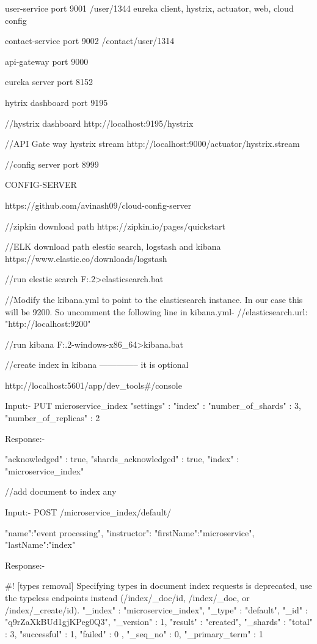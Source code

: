 user-service
			port 9001
			/user/1344
 eureka client, hystrix, actuator, web, cloud config
			
 contact-service
            port 9002
			/contact/user/1314
			
 api-gateway 
          port 9000
		  
 eureka server
          port 8152

 hytrix dashboard
          port 9195
		  
 //hystrix dashboard 		  
 http://localhost:9195/hystrix
 
 
 //API Gate way hystrix stream
 http://localhost:9000/actuator/hystrix.stream
 
 
 //config server
 port 8999
 
 CONFIG-SERVER
 
 https://github.com/avinash09/cloud-config-server

 //zipkin download path
 https://zipkin.io/pages/quickstart

 //ELK download path elestic search, logstash and kibana
 https://www.elastic.co/downloads/logstash

 //run elestic search
F:\Avinash\Microservice\ELK{}.2\bin>elasticsearch.bat


 //Modify the kibana.yml to point to the elasticsearch instance. In our case this will be 9200. So uncomment the following line in kibana.yml-
 //elasticsearch.url: "http://localhost:9200"

 //run kibana
 F:\Avinash\Microservice\ELK{}.2-windows-x86_64\bin>kibana.bat


 //create index in kibana  -------------- it is optional

 http://localhost:5601/app/dev_tools#/console

 Input:-
 PUT microservice_index
{
"settings" : {
"index" : {
"number_of_shards" : 3,
"number_of_replicas" : 2
}
}
}

Response:-

{
  "acknowledged" : true,
  "shards_acknowledged" : true,
  "index" : "microservice_index"
}


//add document to index any

Input:-
POST /microservice_index/default/
{
  "name":"event processing",
  "instructor":{
    "firstName":"microservice",
    "lastName":"index"
  }

}

Response:-

#! [types removal] Specifying types in document index requests is deprecated, use the typeless endpoints instead (/{index}/_doc/{id}, /{index}/_doc, or /{index}/_create/{id}).
{
  "_index" : "microservice_index",
  "_type" : "default",
  "_id" : "q9rZaXkBUd1gjKPeg0Q3",
  "_version" : 1,
  "result" : "created",
  "_shards" : {
    "total" : 3,
    "successful" : 1,
    "failed" : 0
  },
  "_seq_no" : 0,
  "_primary_term" : 1
}



